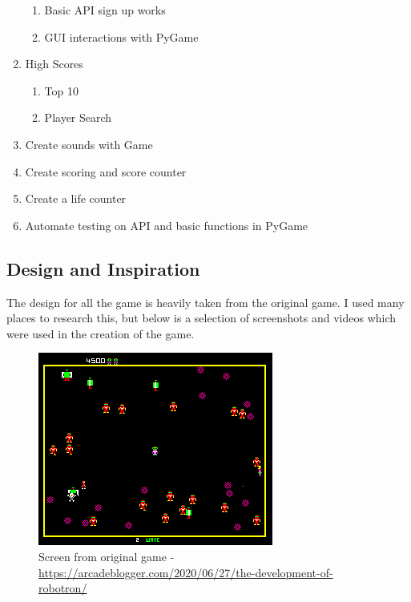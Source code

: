 \documentclass{article}
\begin{document}
\begin{enumerate}
\begin{enumerate}
            \item Basic API sign up works
            \item GUI interactions with PyGame
        \end{enumerate}
    \item High Scores
        \begin{enumerate}
            \item Top 10
            \item Player Search
        \end{enumerate}
    \item Create sounds with Game
    \item Create scoring and score counter
    \item Create a life counter
    \item Automate testing on API and basic functions in PyGame
\end{enumerate}

\subsection{Design and Inspiration}
The design for all the game is heavily taken from the original game. I used many places to research this, but below is a selection of screenshots and videos which were used in the creation of the game.
\begin{figure}[h!]
  \includegraphics[width=0.8\linewidth]{design1.png}
  \centering
  \caption{Screen from original game - \url{https://arcadeblogger.com/2020/06/27/the-development-of-robotron/}}
  \label{fig:Design 1}
\end{figure}
\end{document}
